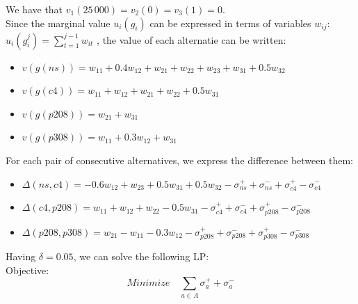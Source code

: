 \documentclass{article}
\begin{document}
We have that $v_1(25\,000) = v_2(0) = v_3(1) = 0$. \\
Since the marginal value $u_i(g_i)$ can be expressed in terms of variables $w_{ij}$: $u_i(g_i^{j}) = \sum _{t=1}^{j-1} w_{it}$ , the value of each alternatie can be written: 
\begin{itemize}
\item $v(g(ns)) = w_{11} + 0.4w_{12} + w_{21} + w_{22} + w_{23} + w_{31} + 0.5w_{32}$
\item $v(g(c4)) = w_{11} + w_{12} + w_{21} + w_{22} + 0.5w_{31}$
\item $v(g(p208)) = w_{21} + w_{31} $
\item $v(g(p308)) = w_{11} + 0.3w_{12} + w_{31}$
\end{itemize}
For each pair of consecutive alternatives, we express the difference between them: 
\begin{itemize}
\item $\Delta (ns,c4) =  -0.6w_{12} + w_{23} + 0.5w_{31} +  0.5w_{32}  -\sigma _{ns}^{+} +\sigma _{ns}^{-} +\sigma _{c4}^{+} - \sigma _{c4}^{-} $
\item $\Delta (c4, p208) = w_{11} + w_{12} + w_{22} - 0.5w_{31} -\sigma _{c4}^{+} +\sigma _{c4}^{-} +\sigma _{p208}^{+} - \sigma _{p208}^{-} $
\item $\Delta (p208, p308) =w_{21} - w_{11} - 0.3w_{12} -\sigma _{p208}^{+} +\sigma _{p208}^{-} +\sigma _{p308}^{+} - \sigma _{p308}^{-} $
\end{itemize}
Having $\delta = 0.05$, we can solve the following LP:\\

Objective:  
\begin{equation}
	Minimize \quad \sum_{a \in A} \sigma _{a}^{+} + \sigma _{a}^{-}
\end{equation}
\end{document}
